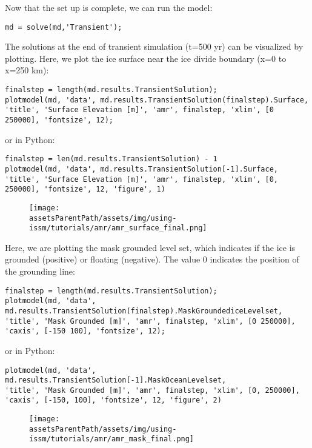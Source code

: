 Now that the set up is complete, we can run the model:
\begin{lstlisting}
md = solve(md,'Transient');
\end{lstlisting}

The solutions at the end of transient simulation (t=500 yr) can be visualized by plotting. Here, we plot the ice surface near the ice divide boundary (x=0 to x=250 km):
\begin{lstlisting}
finalstep = length(md.results.TransientSolution);
plotmodel(md, 'data', md.results.TransientSolution(finalstep).Surface, 'title', 'Surface Elevation [m]', 'amr', finalstep, 'xlim', [0 250000], 'fontsize', 12);
\end{lstlisting}
or in Python:
\begin{lstlisting}
finalstep = len(md.results.TransientSolution) - 1
plotmodel(md, 'data', md.results.TransientSolution[-1].Surface, 'title', 'Surface Elevation [m]', 'amr', finalstep, 'xlim', [0, 250000], 'fontsize', 12, 'figure', 1)
\end{lstlisting}

\begin{figure}[H]
	\begin{center}
		\texttt{[image: \\assetsParentPath/assets/img/using-issm/tutorials/amr/amr\_surface\_final.png]}
	\end{center}
\end{figure}

Here, we are plotting the mask grounded level set, which indicates if the ice is grounded (positive) or floating (negative). The value 0 indicates the position of the grounding line:
\begin{lstlisting}
finalstep = length(md.results.TransientSolution);
plotmodel(md, 'data', md.results.TransientSolution(finalstep).MaskGroundediceLevelset, 'title', 'Mask Grounded [m]', 'amr', finalstep, 'xlim', [0 250000], 'caxis', [-150 100], 'fontsize', 12);
\end{lstlisting}
or in Python:
\begin{lstlisting}
plotmodel(md, 'data', md.results.TransientSolution[-1].MaskOceanLevelset,
'title', 'Mask Grounded [m]', 'amr', finalstep, 'xlim', [0, 250000], 'caxis', [-150, 100], 'fontsize', 12, 'figure', 2)
\end{lstlisting}

\begin{figure}[H]
	\begin{center}
		\texttt{[image: \\assetsParentPath/assets/img/using-issm/tutorials/amr/amr\_mask\_final.png]}
	\end{center}
\end{figure}

